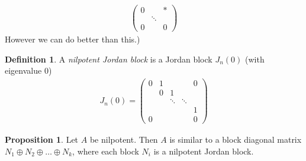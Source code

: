 \documentclass{article}
\theoremstyle{definition} \newtheorem*{definition}{Definition}
\newtheorem{proposition}[theorem]{Proposition}
\begin{document}
\begin{align*}
  \left( 
  \begin{matrix}
    0 &&*\\
    &\ddots&\\
    0&&0
  \end{matrix}
  \right)
\end{align*}
However we can do better than this.)

\begin{definition}
  A \textit{nilpotent Jordan block} is a Jordan block $J_n(0)$ (with 
  eigenvalue 0)
  \begin{align*}
    J_n(0) = \left( 
    \begin{matrix}
      0 & 1 &&&0\\
      &0&1&&\\
      &&\ddots&\ddots&\\
      &&&&1\\
      0&&&&0
    \end{matrix}
    \right)
  \end{align*}
\end{definition}

\begin{proposition}
  Let $A$ be nilpotent. Then $A$ is similar to a block diagonal matrix
  $N_1 \oplus N_2 \oplus \dots \oplus N_k$, where each block $N_i$
  is a nilpotent Jordan block.
  \label{prp:nilpotentjordblock}
\end{proposition}
\end{document}
